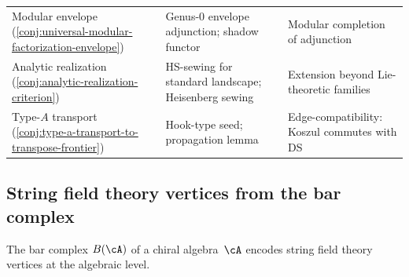 \begin{remark}
\begin{center}
\begin{tabular}{@{}p{3.7cm}p{3.8cm}p{4.5cm}@{}}
Modular envelope
 \textup{(\ref{conj:universal-modular-factorization-envelope})}
 & Genus-$0$ envelope adjunction; shadow functor
 & Modular completion of adjunction \\[4pt]
Analytic realization
 \textup{(\ref{conj:analytic-realization-criterion})}
 & HS-sewing for standard landscape; Heisenberg sewing
 & Extension beyond Lie-theoretic families \\[4pt]
Type-$A$ transport
 \textup{(\ref{conj:type-a-transport-to-transpose-frontier})}
 & Hook-type seed; propagation lemma
 & Edge-compatibility: Koszul commutes with DS \\
\bottomrule
\end{tabular}
\end{center}
\end{remark}

%
%

\subsection{String field theory vertices from the bar complex}
\label{subsec:frontier-sft-vertices}

The bar complex $B(\cA)$ of a chiral algebra~$\cA$ encodes
string field theory vertices at the algebraic level.

